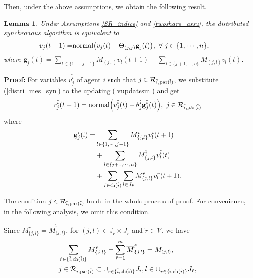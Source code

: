 \documentclass[journal]{IEEEtran}
\newtheorem{lemma}{Lemma}[section]
\begin{document}
Then, under the above assumptions, we obtain the following result.
\begin{lemma}\label{cmp_lem}
	Under Assumptions \ref{SR_indice} and \ref{twoshare_assu}, the distributed synchronous algorithm is equivalent to
	\begin{align}\label{distri_mapping}
	v_j(t+1)=&{\rm normal}\big(v_j(t)-\Theta_{(j,j)} \mathbf{g}_j(t)\big), \ \forall \ j\in \{1,\cdots,n\},
	\end{align}
	where $\mathbf{g}_j(t)=\sum_{l\in  \{1,\cdots,j-1\}} M_{(j,l)} v_l(t+1)+\sum_{l\in \{j+1,\cdots,n\}} M_{(j,l)} v_l(t)$.
\end{lemma}
\par\textbf{Proof:}
For variables $v_j^{\tilde{i}}$ of agent $\tilde{i}$ such that $j\in \mathcal{R}_{\tilde{i},{\rm par}(\tilde{i})}$, we substitute (\ref{distri_mes_syn}) to the updating (\ref{vupdatesm}) and get
\begin{align}\label{vr_up}
v_j^{\tilde{i}}(t+1)
={\rm normal}\Big(v_j^{\tilde{i}}(t)-\theta_j^{\tilde{i}} \mathbf{g}^{\tilde{i}}_j(t)\Big),\ j\in \mathcal{R}_{\tilde{i},{\rm par}(\tilde{i})}
\end{align}
where 
\begin{align}\label{PHI}
\mathbf{g}^{\tilde{i}}_j(t)=&\sum_{l\in  \{1,\cdots,j-1\}} M^{\tilde{i}}_{\{j,l\}} {v}_l^{\tilde{i}}(t+1)\notag\\
&+\sum_{l\in \{j+1,\cdots,n\}} M^{\tilde{i}}_{\{j,l\}} {v}_l^{\tilde{i}}(t)\notag\\
&+\sum_{\tilde{r}\in {\rm ch}(\tilde{i})}\sum_{l\in J_{\tilde{r}}} M_{\{j,l\}}^{\tilde{r}} v_{l}^{\tilde{r}}(t+1).
\end{align}
\par The condition $j\in \mathcal{R}_{\tilde{i},{\rm par}(\tilde{i})}$ holds in the whole process of proof. For convenience, in the following analysis, we omit this condition.
\par {Since} $M_{\{j,l\}}^{\tilde{r}}=\overline{M}_{\{j,l\}}^{\tilde{r}}$, for $(j,l)\in J_{\tilde{r}}\times J_{\tilde{r}}$ and $\tilde{r}\in \mathcal{V}$, we have
\begin{align}\label{msum}
&\sum_{\tilde{r}\in \{\tilde{i},{\rm ch}(\tilde{i})\}} {M}^{\tilde{r}}_{\{j,l\}}=\sum_{\tilde{r}=1}^m \overline{M}^{\tilde{r}}_{\{j,l\}}=M_{(j,l)},\\
& j\in \mathcal{R}_{\tilde{i},{\rm par}(\tilde{i})}\subset  \cup_{\tilde{r}\in \{\tilde{i},{\rm ch}(\tilde{i})\}} J_{\tilde{r}}, l\in \cup_{\tilde{r}\in \{\tilde{i},{\rm ch}(\tilde{i})\}}J_{\tilde{r}},\notag
\end{align}
\end{document}
